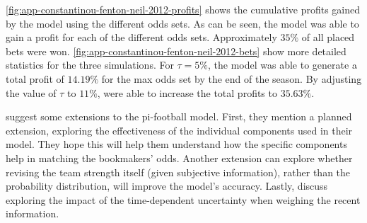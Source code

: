 \cref{fig:app-constantinou-fenton-neil-2012-profits} shows the cumulative profits gained by the model using the different odds sets. As can be seen, the model was able to gain a profit for each of the different odds sets. Approximately $35\%$ of all placed bets were won. \cref{fig:app-constantinou-fenton-neil-2012-bets} show more detailed statistics for the three simulations. For $\tau = 5\%$, the model was able to generate a total profit of $14.19\%$ for the max odds set by the end of the season. By adjusting the value of $\tau$ to $11\%$, \citet{bib:constantinou-fenton-neil-2012} were able to increase the total profits to $35.63\%$.

\citet{bib:constantinou-fenton-neil-2012} suggest some extensions to the pi-football model. First, they mention a planned extension, exploring the effectiveness of the individual components used in their model. They hope this will help them understand how the specific components help in matching the bookmakers' odds. Another extension can explore whether revising the team strength itself (given subjective information), rather than the probability distribution, will improve the model's accuracy. Lastly, \citet{bib:constantinou-fenton-neil-2012} discuss exploring the impact of the time-dependent uncertainty when weighing the recent information. 